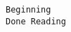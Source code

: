 \documentclass[11pt]{article}
\begin{document}
    \begin{Verbatim}[commandchars=\\\{\}]
Beginning
Done Reading

    \end{Verbatim}


    
    
    
    
\end{document}
